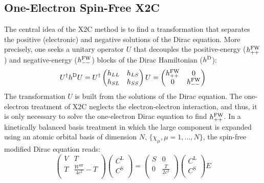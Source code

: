 \documentclass{article}
\begin{document}
\subsection{One-Electron Spin-Free X2C} 
The central idea of the X2C method is to find a transformation that separates the positive (electronic) and negative solutions of the Dirac equation.
More precisely, one seeks a unitary operator $U$ that decouples the positive-energy ($h^{\rm FW}_{++}$) and negative-energy ($h^{\rm FW}_{--}$) blocks of the Dirac Hamiltonian ($h^{\rm D}$):
\begin{equation}
U^\dagger h^{\rm D} U = 
U^\dagger
\begin{pmatrix}
h_{LL} & h_{LS} \\
h_{SL} & h_{SS}
\end{pmatrix}
 U
 =
 \begin{pmatrix}
h^{\rm FW}_{++} & 0 \\
0 & h^{\rm FW}_{--}
\end{pmatrix}
\end{equation}
The transformation $U$ is built from the solutions of the Dirac equation.
The one-electron treatment of X2C neglects the electron-electron interaction, and thus, it is only necessary to solve the one-electron Dirac equation to find $h^{\rm FW}_{++}$.
In a kinetically balanced basis treatment\cite{Kinetic-balance,Dyall-KB} in which the large component is expanded using an atomic orbital basis of dimension $N$, $\{\chi_{\mu}, \mu=1,...,N\}$, the spin-free modified Dirac equation reads:
\begin{equation}
\left(
\begin{array}{cc}
{V}                   &  {T} \\
{T} & \frac{W^{\text{SF}}}{4c^2}-{T} \\ 
\end{array}
\right)
\left(
\begin{array}{c}
{C}^{\text{L}}                   \\
{C}^{\text{S}}  \\ 
\end{array}
\right)  
= \left(
\begin{array}{cc}
{S}                  &  {0}\\
{0} & \frac{{T}}{2c^2} \\ 
\end{array}
\right)
\left(
\begin{array}{c}
{C}^{\text{L}}                    \\
{C}^{\text{S}}  \\ 
\end{array}
\right)  E
\label{eq:Dirac_ham_mine}
\end{equation}
\end{document}
